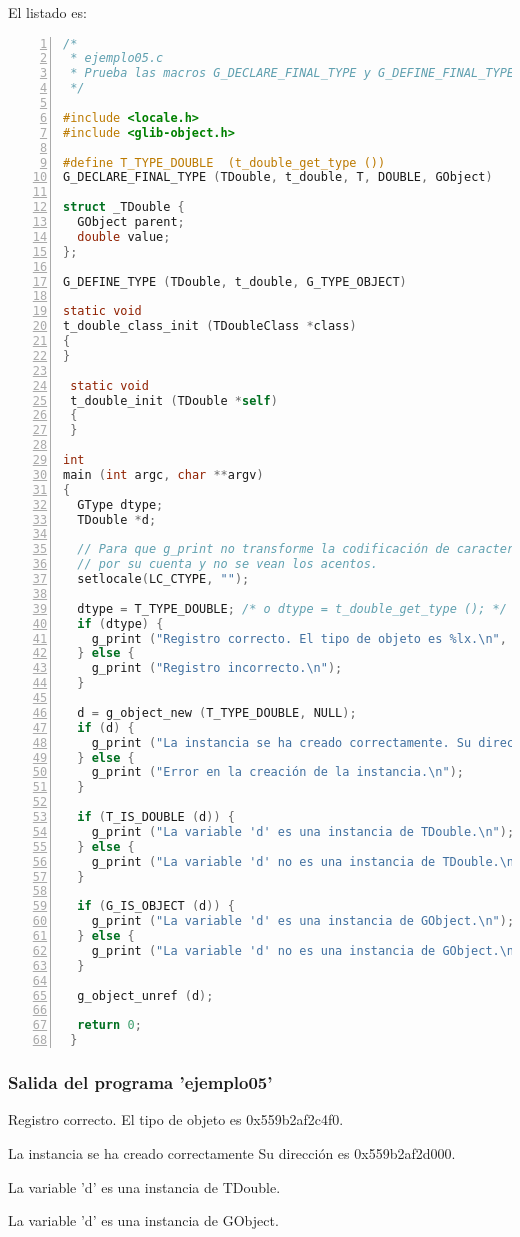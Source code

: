 El listado es:
\begin{lstlisting}[language=C, numbers=left]
/*
 * ejemplo05.c
 * Prueba las macros G_DECLARE_FINAL_TYPE y G_DEFINE_FINAL_TYPE
 */

#include <locale.h>
#include <glib-object.h>
 
#define T_TYPE_DOUBLE  (t_double_get_type ())
G_DECLARE_FINAL_TYPE (TDouble, t_double, T, DOUBLE, GObject)
 
struct _TDouble {
  GObject parent;
  double value;
};
 
G_DEFINE_TYPE (TDouble, t_double, G_TYPE_OBJECT)
 
static void
t_double_class_init (TDoubleClass *class)
{
}
 
 static void
 t_double_init (TDouble *self)
 {
 }
 
int
main (int argc, char **argv)
{
  GType dtype;
  TDouble *d;

  // Para que g_print no transforme la codificación de caracteres
  // por su cuenta y no se vean los acentos.
  setlocale(LC_CTYPE, "");
  
  dtype = T_TYPE_DOUBLE; /* o dtype = t_double_get_type (); */
  if (dtype) {
    g_print ("Registro correcto. El tipo de objeto es %lx.\n", dtype);
  } else {
    g_print ("Registro incorrecto.\n");
  }
 
  d = g_object_new (T_TYPE_DOUBLE, NULL);
  if (d) {
    g_print ("La instancia se ha creado correctamente. Su dirección es %p.\n", d);
  } else {
    g_print ("Error en la creación de la instancia.\n");
  }
 
  if (T_IS_DOUBLE (d)) {
    g_print ("La variable 'd' es una instancia de TDouble.\n");
  } else {
    g_print ("La variable 'd' no es una instancia de TDouble.\n");
  }
 
  if (G_IS_OBJECT (d)) {
    g_print ("La variable 'd' es una instancia de GObject.\n");
  } else {
    g_print ("La variable 'd' no es una instancia de GObject.\n");
  }
  
  g_object_unref (d);
 
  return 0;
 }
\end{lstlisting}

 \subsubsection{Salida del programa 'ejemplo05'}
\textsf{Registro correcto. El tipo de objeto es 0x559b2af2c4f0.}\par
\textsf{La instancia se ha creado correctamente Su dirección es 0x559b2af2d000.}\par
\textsf{La variable 'd' es una instancia de TDouble.}\par
\textsf{La variable 'd' es una instancia de GObject.}\par

